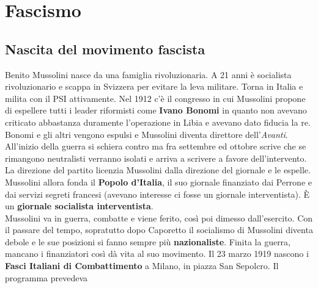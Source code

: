 \section{Fascismo}
\subsection{Nascita del movimento fascista}
Benito Mussolini nasce da una famiglia rivoluzionaria. A 21 anni è socialista rivoluzionario e scappa
in Svizzera per evitare la leva militare. Torna in Italia e milita con il PSI attivamente. Nel 1912 
c'è il congresso in cui Mussolini propone di espellere tutti i leader riformisti come 
\textbf{Ivano Bonomi} in quanto non avevano criticato abbastanza duramente l'operazione in Libia e 
avevano dato fiducia la re. Bonomi e gli altri vengono espulsi e Mussolini diventa direttore 
dell'\textit{Avanti}.\\
All'inizio della guerra si schiera contro ma fra settembre ed ottobre scrive che se rimangono
neutralisti verranno isolati e arriva a scrivere a favore dell'intervento. La direzione del partito
licenzia Mussolini dalla direzione del giornale e le espelle. Mussolini allora fonda il 
\textbf{Popolo d'Italia}, il suo giornale finanziato dai Perrone e dai servizi segreti francesi 
(avevano interesse ci fosse un giornale interventista). È un \textbf{giornale socialista 
interventista}.\\
Mussolini va in guerra, combatte e viene ferito, così poi dimesso dall'esercito. Con il passare del
tempo, sopratutto dopo Caporetto il socialismo di Mussolini diventa debole e le sue posizioni si 
fanno sempre più \textbf{nazionaliste}. Finita la guerra, mancano i finanziatori così dà vita al
suo movimento. Il 23 marzo 1919 nascono i \textbf{Fasci Italiani di Combattimento} a Milano, in 
piazza San Sepolcro. Il programma prevedeva
